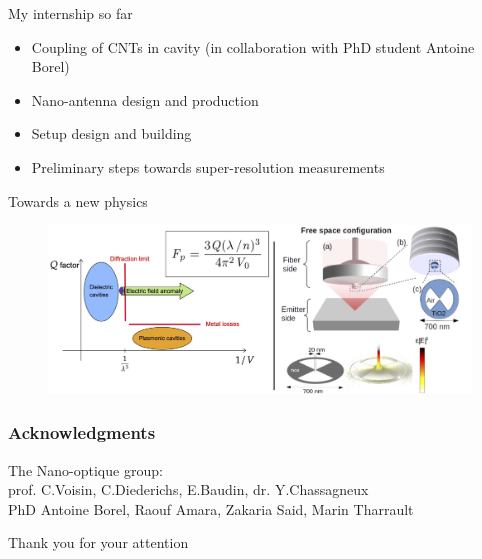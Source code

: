 \documentclass[xcolor = {dvipsnames}]{beamer}
\begin{document}
\begin{frame}{My internship so far}
\begin{itemize}
\item Coupling of CNTs in cavity (in collaboration with PhD student Antoine Borel)
\item Nano-antenna design and production
\item Setup design and building
\item Preliminary steps towards super-resolution measurements
\end{itemize}
\end{frame}

\begin{frame}{Towards a new physics}
\begin{figure}
    \centering

    \includegraphics[width=1\textwidth]{images/fine}
    \end{figure}
\end{frame}
\begin{frame}
\frametitle{Acknowledgments}
The Nano-optique group:\\ 
\vspace{1mm}
prof. C.Voisin, C.Diederichs, E.Baudin, dr. Y.Chassagneux \\
\vspace{1mm}
PhD Antoine Borel, Raouf Amara, Zakaria Said, Marin Tharrault
\end{frame}

\begin{frame}
\centering
\Large Thank you for your attention
\end{frame}
\end{document}
